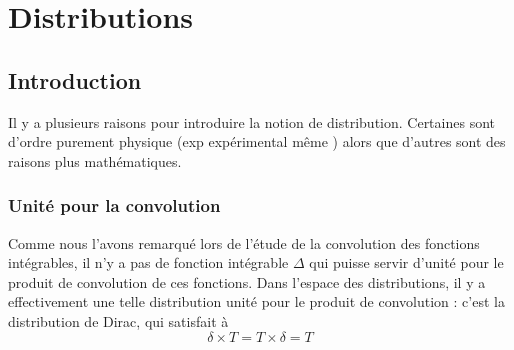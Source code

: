 \documentclass{book}
\begin{document}
\chapter{Distributions}
\section{Introduction}
Il y a plusieurs raisons pour introduire la notion de distribution. 
Certaines sont d'ordre purement physique (exp expérimental même ) 
alors que d’autres sont des raisons plus mathématiques.
\subsection{Unité pour la convolution} 
\begin{theoreme}{}{}Comme nous l'avons remarqué lors de l'étude de la convolution des fonctions intégrables, il n'y a pas de fonction intégrable 
$\Delta$ qui puisse servir d'unité pour le produit de convolution de ces fonctions. Dans l'espace des distributions, il y a effectivement une telle distribution unité pour le produit de convolution : c'est la distribution de Dirac, qui satisfait à
$$\delta\times T=T\times\delta=T$$
\end{theoreme}
\end{document}
